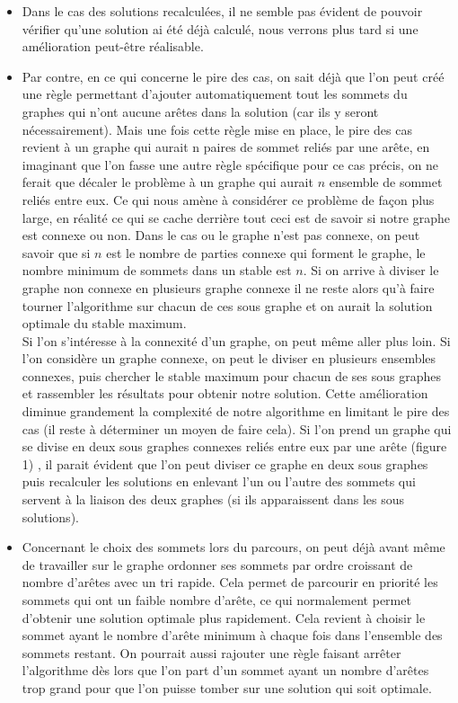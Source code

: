 \documentclass[10pt,a4paper]{article}
\begin{document}
\begin{itemize}
\item Dans le cas des solutions recalculées, il ne semble pas évident de pouvoir vérifier qu'une solution ai été déjà calculé, nous verrons plus tard si une amélioration peut-être réalisable.
\\
\item Par contre, en ce qui concerne le pire des cas, on sait déjà que l'on peut créé une règle permettant d'ajouter automatiquement tout les sommets du graphes qui n'ont aucune arêtes dans la solution (car ils y seront nécessairement). Mais une fois cette règle mise en place, le pire des cas revient à un graphe qui aurait n paires de sommet reliés par une arête, en imaginant que l'on fasse une autre règle spécifique pour ce cas précis, on ne ferait que décaler le problème à un graphe qui aurait $n$ ensemble de sommet reliés entre eux. Ce qui nous amène à considérer ce problème de façon plus large, en réalité ce qui se cache derrière tout ceci est de savoir si notre graphe est connexe ou non. Dans le cas ou le graphe n'est pas connexe, on peut savoir que si $n$ est le nombre de parties connexe qui forment le graphe, le nombre minimum de sommets dans un stable est $n$. Si on arrive à diviser le graphe non connexe en plusieurs graphe connexe il ne reste alors qu'à faire tourner l'algorithme sur chacun de ces sous graphe et on aurait la solution optimale du stable maximum.
\\
Si l'on s'intéresse à la connexité d'un graphe, on peut même aller plus loin. Si l'on considère un graphe  connexe, on peut le diviser en plusieurs ensembles connexes, puis chercher le stable maximum pour chacun de ses sous graphes et rassembler les résultats pour obtenir notre solution. Cette amélioration diminue grandement la complexité de notre algorithme en limitant le pire des cas (il reste à déterminer un moyen de faire cela). Si l'on prend un graphe qui se divise en deux sous graphes connexes reliés entre eux par une arête (figure 1) , il parait évident que l'on peut diviser ce graphe en deux sous graphes puis recalculer les solutions en enlevant l'un ou l'autre des sommets qui servent à la liaison des deux graphes (si ils apparaissent dans les sous solutions).
\\

\item Concernant le choix des sommets lors du parcours, on peut déjà avant même de travailler sur le graphe ordonner ses sommets par ordre croissant de nombre d'arêtes avec un tri rapide. Cela permet de parcourir en priorité les sommets qui ont un faible nombre d'arête, ce qui normalement permet d'obtenir une solution optimale plus rapidement. Cela revient à choisir le sommet ayant le nombre d'arête minimum à chaque fois dans l'ensemble des sommets restant. On pourrait aussi rajouter une règle faisant arrêter l'algorithme dès lors que l'on part d'un sommet ayant un nombre d'arêtes trop grand pour que l'on puisse tomber sur une solution qui soit optimale.\\\\
\end{itemize}
\end{document}
